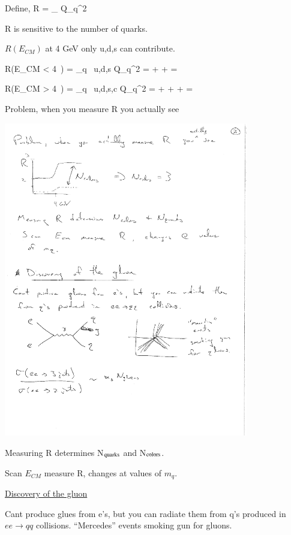 {Define,
\be
R \equiv {} = \sum_{} Q_q^2
\ee

R is sensitive to the number of quarks.


$R(E_{CM})$ at 4 GeV only u,d,s can contribute.

\be
R(E_{CM} < 4\ ) = \sum_{q \in\ u,d,s} Q_q^2 =  +  +  = 
\ee


\be
R(E_{CM} > 4\ ) = \sum_{q \in\ u,d,s,c} Q_q^2 =  +  +  +  = 
\ee

\clearpage

Problem, when you measure R you actually see

\bc
\includegraphics[width=0.8\textwidth]{./ObservedR.pdf}
\ec

Measuring R determines N$_{\textrm{quarks}}$ and N$_{\textrm{colors}}$.

Scan $E_{CM}$ measure R, changes at values of $m_q$.


\underline{Discovery of the gluon}

Cant produce glues from e's, but you can radiate them from q's produced in $ee\rightarrow qq$ collisions.
``Mercedes'' events smoking gun for gluons.

}

